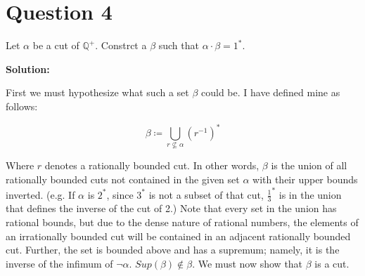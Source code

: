 \documentclass[12pt, letterpaper]{article}
\begin{document}
\section*{Question 4}
Let $\alpha$ be a cut of $\mathbb{Q}^+$. Constrct a $\beta$ such that $\alpha \cdot \beta = 1^*$.

\noindent\textbf{Solution:}

\noindent First we must hypothesize what such a set $\beta$ could be. I have defined mine as follows:

$$\beta \coloneqq \bigcup\limits_{r \nsubseteq \alpha} (r^{-1})^*$$

Where $r$ denotes a rationally bounded cut. In other words, $\beta$ is the union of all rationally bounded cuts not contained in the given set $\alpha$ with their upper bounds inverted.
(e.g. If $\alpha$ is $2^*$, since $3^*$ is not a subset of that cut, $\frac{1}{3}^*$
is in the union that defines the inverse of the cut of 2.) Note that every set in the union has rational bounds,
but due to the dense nature of rational numbers, the elements of an irrationally bounded cut will be contained in an adjacent rationally bounded cut. Further, the set is bounded above and has a supremum; namely, it is the inverse of the infimum of $\neg \alpha$. $Sup(\beta) \notin \beta$.
We must now show that $\beta$ is a cut.
\end{document}
